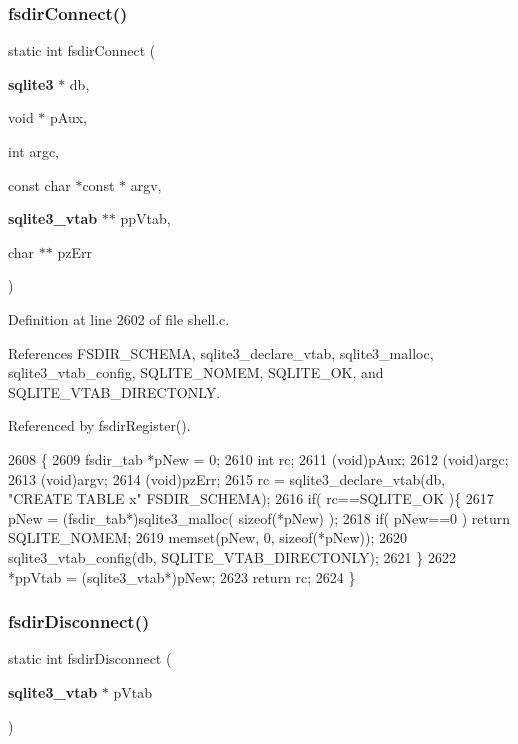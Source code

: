 \subsubsection{fsdir\+Connect()}
{\footnotesize\ttfamily static int fsdir\+Connect (\begin{DoxyParamCaption}\item[{\textbf{ sqlite3} $\ast$}]{db,  }\item[{void $\ast$}]{p\+Aux,  }\item[{int}]{argc,  }\item[{const char $\ast$const $\ast$}]{argv,  }\item[{\textbf{ sqlite3\+\_\+vtab} $\ast$$\ast$}]{pp\+Vtab,  }\item[{char $\ast$$\ast$}]{pz\+Err }\end{DoxyParamCaption})\hspace{0.3cm}{\ttfamily [static]}}



Definition at line 2602 of file shell.\+c.



References F\+S\+D\+I\+R\+\_\+\+S\+C\+H\+E\+MA, sqlite3\+\_\+declare\+\_\+vtab, sqlite3\+\_\+malloc, sqlite3\+\_\+vtab\+\_\+config, S\+Q\+L\+I\+T\+E\+\_\+\+N\+O\+M\+EM, S\+Q\+L\+I\+T\+E\+\_\+\+OK, and S\+Q\+L\+I\+T\+E\+\_\+\+V\+T\+A\+B\+\_\+\+D\+I\+R\+E\+C\+T\+O\+N\+LY.



Referenced by fsdir\+Register().


\begin{DoxyCode}
2608  \{
2609   fsdir_tab *pNew = 0;
2610   \textcolor{keywordtype}{int} rc;
2611   (void)pAux;
2612   (void)argc;
2613   (void)argv;
2614   (void)pzErr;
2615   rc = sqlite3_declare_vtab(db, \textcolor{stringliteral}{"CREATE TABLE x"} FSDIR_SCHEMA);
2616   \textcolor{keywordflow}{if}( rc==SQLITE_OK )\{
2617     pNew = (fsdir_tab*)sqlite3_malloc( \textcolor{keyword}{sizeof}(*pNew) );
2618     \textcolor{keywordflow}{if}( pNew==0 ) \textcolor{keywordflow}{return} SQLITE_NOMEM;
2619     memset(pNew, 0, \textcolor{keyword}{sizeof}(*pNew));
2620     sqlite3_vtab_config(db, SQLITE_VTAB_DIRECTONLY);
2621   \}
2622   *ppVtab = (sqlite3_vtab*)pNew;
2623   \textcolor{keywordflow}{return} rc;
2624 \}
\end{DoxyCode}
\mbox{\label{shell_8c_af124b9c18c821e8c826ee8a0e4e14c50}} 
\subsubsection{fsdir\+Disconnect()}
{\footnotesize\ttfamily static int fsdir\+Disconnect (\begin{DoxyParamCaption}\item[{\textbf{ sqlite3\+\_\+vtab} $\ast$}]{p\+Vtab }\end{DoxyParamCaption})\hspace{0.3cm}{\ttfamily [static]}}




